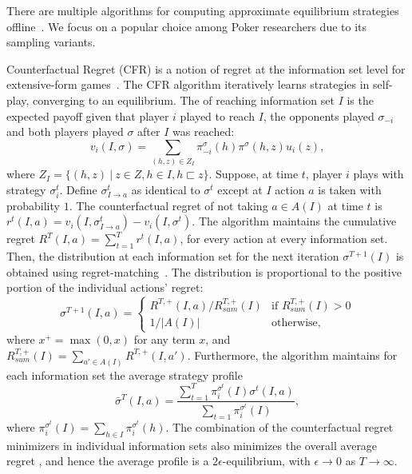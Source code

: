 \documentclass{aamas2015}
\newcommand{\defword}[1]{\textbf{\boldmath{#1}}}
\begin{document}
There are multiple algorithms for computing approximate equilibrium strategies offline~\cite{Sandholm10The}. We focus on a popular choice among Poker researchers due to its sampling variants.

Counterfactual Regret (CFR) is a notion of regret at the information set level for extensive-form games~\cite{CFR}. 
The CFR algorithm iteratively learns strategies in self-play, converging to an equilibrium. 
The \defword{counterfactual value} of reaching information set $I$ is the expected payoff given that player $i$ played to reach $I$, the opponents played 
$\sigma_{-i}$ and both players played $\sigma$ after $I$ was reached:
\begin{equation}
\label{eq:cfv}
v_i(I,\sigma) = \sum_{(h,z) \in Z_I} \pi^{\sigma}_{-i}(h) \pi^{\sigma}(h,z) u_i(z), 
\end{equation}
where $Z_I = \{ (h,z)~|~z \in Z, h \in I, h \sqsubset z \}$.
Suppose, at time $t$, player $i$ plays with strategy $\sigma^t_i$. 
Define $\sigma^t_{I \rightarrow a}$ as identical to $\sigma^t$ except at $I$ action $a$ is taken with probability $1$. 
The counterfactual regret of not taking $a \in A(I)$ at time $t$ is $r^t(I,a) = v_i(I,\sigma^t_{I \rightarrow a}) - v_i(I,\sigma^t)$. 
The algorithm maintains the cumulative regret $R^T(I,a) = \sum_{t=1}^T r^t(I,a)$, for every action at every information set. 
Then, the distribution at each information set for the next iteration $\sigma^{T+1}(I)$ is obtained using 
regret-matching~\cite{Hart00}. The distribution is proportional to the positive portion of the individual actions' regret:
\begin{equation*}
\label{eq:rm}
\sigma^{T+1}(I,a) = \left\{
\begin{array}{ll}
R^{T,+}(I,a) / R^{T,+}_{sum}(I) & \mbox{if } R^{T,+}_{sum}(I) > 0 \\ 
1 / |A(I)| & \mbox{otherwise,}
\end{array} \right.
\end{equation*}
where $x^+ = \max(0,x)$ for any term $x$, and $R^{T,+}_{sum}(I) = \sum_{a' \in A(I)} R^{T,+}(I,a')$. Furthermore, the algorithm maintains for each information set the average strategy profile
\begin{equation}
\bar{\sigma}^T(I,a) = \frac{\sum_{t=1}^T \pi^{\sigma^t}_i(I) \sigma^t(I,a)}{\sum_{t=1} \pi^{\sigma^t}_i(I)}, 
\end{equation}
where $\pi^{\sigma^t}_i(I) = \sum_{h \in I}\pi^{\sigma^t}_i(h)$.
The combination of the counterfactual regret minimizers in individual information sets also minimizes the overall average regret \cite{CFR}, and hence the average profile is a $2\epsilon$-equilibrium, with $\epsilon \rightarrow 0$
as $T \rightarrow \infty$.
\end{document}
